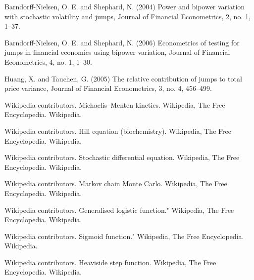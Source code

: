 \begin{thebibliography}{00}
Barndorff-Nielsen, O. E. and Shephard, N. (2004) 
\newblock Power and bipower variation with stochastic volatility and jumps, 
\newblock Journal of Financial Econometrics, 2, no. 1, 1–37.
	
Barndorff-Nielsen, O. E. and Shephard, N. (2006) 
\newblock Econometrics of testing for jumps in financial economics using bipower variation, 
\newblock Journal of Financial Econometrics, 4, no. 1, 1–30.
	
Huang, X. and Tauchen, G. (2005) 
\newblock The relative contribution of jumps to total price variance, 
\newblock Journal of Financial Econometrics, 3, no. 4, 456–499.

Wikipedia contributors. 
\newblock Michaelis–Menten kinetics. 
\newblock Wikipedia, The Free Encyclopedia. Wikipedia.

Wikipedia contributors. 
\newblock Hill equation (biochemistry).
\newblock Wikipedia, The Free Encyclopedia. Wikipedia. 

Wikipedia contributors. 
\newblock Stochastic differential equation.
\newblock Wikipedia, The Free Encyclopedia. Wikipedia.

Wikipedia contributors. 
\newblock Markov chain Monte Carlo.
\newblock Wikipedia, The Free Encyclopedia. Wikipedia.

Wikipedia contributors. 
\newblock Generalised logistic function." 
\newblock Wikipedia, The Free Encyclopedia. Wikipedia. 

Wikipedia contributors. 
\newblock Sigmoid function." 
\newblock Wikipedia, The Free Encyclopedia. Wikipedia. 

Wikipedia contributors. 
\newblock Heaviside step function.
\newblock Wikipedia, The Free Encyclopedia. Wikipedia.
\end{thebibliography}


